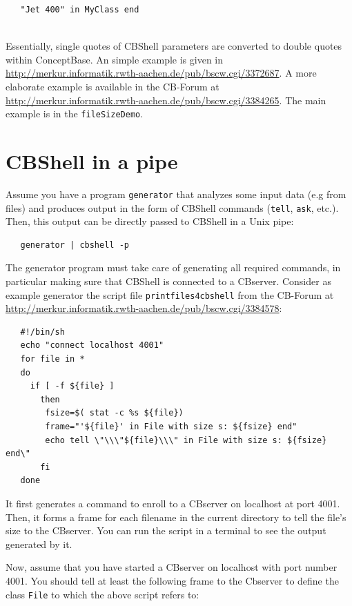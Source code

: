 \begin{verbatim}
   "Jet 400" in MyClass end


\end{verbatim}

Essentially, single quotes of CBShell parameters are converted to double quotes within ConceptBase.
An simple example is given in
\url{http://merkur.informatik.rwth-aachen.de/pub/bscw.cgi/3372687}.
A more elaborate example is available in the CB-Forum at
\url{http://merkur.informatik.rwth-aachen.de/pub/bscw.cgi/3384265}.
The main example is in the {\tt fileSizeDemo}.


\section{CBShell in a pipe}
\label{sec:cbshellpipe}

Assume you have a program {\tt generator} that analyzes some input data (e.g from files) and
produces output in the form of CBShell commands ({\tt tell}, {\tt ask}, etc.). Then,
this output can be directly passed to CBShell in a Unix pipe:

\begin{verbatim}
   generator | cbshell -p
\end{verbatim}

The generator program must take care of generating all required commands, in particular
making sure that CBShell is connected to a CBserver. Consider as example generator the 
script file {\tt print\-files\-4cbshell}  from the
CB-Forum at
\url{http://merkur.informatik.rwth-aachen.de/pub/bscw.cgi/3384578}:

\begin{verbatim}
   #!/bin/sh
   echo "connect localhost 4001" 
   for file in *
   do
     if [ -f ${file} ] 
       then
        fsize=$( stat -c %s ${file})
        frame="'${file}' in File with size s: ${fsize} end"
        echo tell \"\\\"${file}\\\" in File with size s: ${fsize} end\"
       fi
   done
\end{verbatim}

It first generates a command to enroll to a CBserver on localhost at port 4001.
Then, it forms a frame for each filename in the current directory to tell the
file's size to the CBserver. 
You can run the script in a terminal to see the output generated by it. 

Now, assume that you have started a CBserver on localhost with port number 4001.
You should tell at least the following frame to the Cbserver to define
the class {\tt File} to which the above script refers to:

